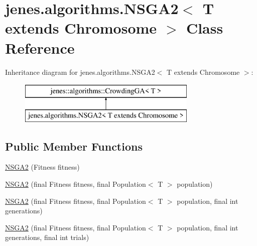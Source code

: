 \hypertarget{classjenes_1_1algorithms_1_1_n_s_g_a2_3_01_t_01extends_01_chromosome_01_4}{\section{jenes.\-algorithms.\-N\-S\-G\-A2$<$ T extends Chromosome $>$ Class Reference}
\label{classjenes_1_1algorithms_1_1_n_s_g_a2_3_01_t_01extends_01_chromosome_01_4}
}
Inheritance diagram for jenes.\-algorithms.\-N\-S\-G\-A2$<$ T extends Chromosome $>$\-:\begin{figure}[H]
\begin{center}
\leavevmode
\includegraphics[height=2.000000cm]{classjenes_1_1algorithms_1_1_n_s_g_a2_3_01_t_01extends_01_chromosome_01_4}
\end{center}
\end{figure}
\subsection*{Public Member Functions}
\begin{DoxyCompactItemize}
\item 
\hyperlink{classjenes_1_1algorithms_1_1_n_s_g_a2_3_01_t_01extends_01_chromosome_01_4_a0e9264bdd3c0f0f73fecdc89038b2898}{N\-S\-G\-A2} (Fitness fitness)
\item 
\hyperlink{classjenes_1_1algorithms_1_1_n_s_g_a2_3_01_t_01extends_01_chromosome_01_4_a49f57f66489874c5bf12b3f9c89e6fcc}{N\-S\-G\-A2} (final Fitness fitness, final Population$<$ T $>$ population)
\item 
\hyperlink{classjenes_1_1algorithms_1_1_n_s_g_a2_3_01_t_01extends_01_chromosome_01_4_a4da7d36c029be00959ea063643833486}{N\-S\-G\-A2} (final Fitness fitness, final Population$<$ T $>$ population, final int generations)
\item 
\hyperlink{classjenes_1_1algorithms_1_1_n_s_g_a2_3_01_t_01extends_01_chromosome_01_4_ac0873ceec23f2908e64650b2e0f2b62a}{N\-S\-G\-A2} (final Fitness fitness, final Population$<$ T $>$ population, final int generations, final int trials)
\end{DoxyCompactItemize}
